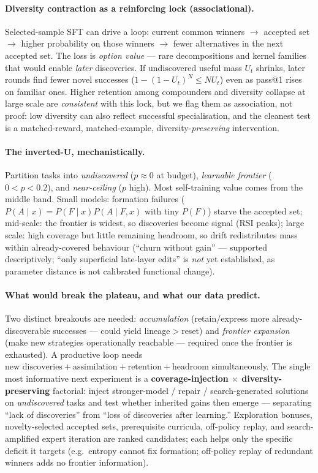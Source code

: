 \paragraph{Diversity contraction as a reinforcing lock (associational).}
Selected-sample SFT can drive a loop: current common winners $\to$ accepted set $\to$ higher probability on
those winners $\to$ fewer alternatives in the next accepted set. The loss is \emph{option value} --- rare
decompositions and kernel families that would enable \emph{later} discoveries. If undiscovered useful mass
$U_t$ shrinks, later rounds find fewer novel successes ($1-(1-U_t)^N\le NU_t$) even as pass@1 rises on familiar
ones. Higher retention among compounders and diversity collapse at large scale are \emph{consistent} with this
lock, but we flag them as association, not proof: low diversity can also reflect successful specialisation, and
the cleanest test is a matched-reward, matched-example, diversity-\emph{preserving} intervention.

\paragraph{The inverted-U, mechanistically.} Partition tasks into \emph{undiscovered} ($p{\approx}0$ at budget),
\emph{learnable frontier} ($0<p<0.2$), and \emph{near-ceiling} ($p$ high). Most self-training value comes from
the middle band. Small models: formation failures ($P(A\mid x)=P(F\mid x)P(A\mid F,x)$ with tiny $P(F)$) starve
the accepted set; mid-scale: the frontier is widest, so discoveries become signal (RSI peaks); large scale:
high coverage but little remaining headroom, so drift redistributes mass within already-covered behaviour
(``churn without gain'' --- supported descriptively; ``only superficial late-layer edits'' is \emph{not} yet
established, as parameter distance is not calibrated functional change).

\paragraph{What would break the plateau, and what our data predict.}
Two distinct breakouts are needed: \emph{accumulation} (retain/express more already-discoverable successes ---
could yield lineage$>$reset) and \emph{frontier expansion} (make new strategies operationally reachable ---
required once the frontier is exhausted). A productive loop needs
$\text{new discoveries}+\text{assimilation}+\text{retention}+\text{headroom}$ simultaneously. The single most
informative next experiment is a \textbf{coverage-injection $\times$ diversity-preserving} factorial: inject
stronger-model / repair / search-generated solutions on \emph{undiscovered} tasks and test whether inherited
gains then emerge --- separating ``lack of discoveries'' from ``loss of discoveries after learning.''
Exploration bonuses, novelty-selected accepted sets, prerequisite curricula, off-policy replay, and
search-amplified expert iteration are ranked candidates; each helps only the specific deficit it targets (e.g.\
entropy cannot fix formation; off-policy replay of redundant winners adds no frontier information).

